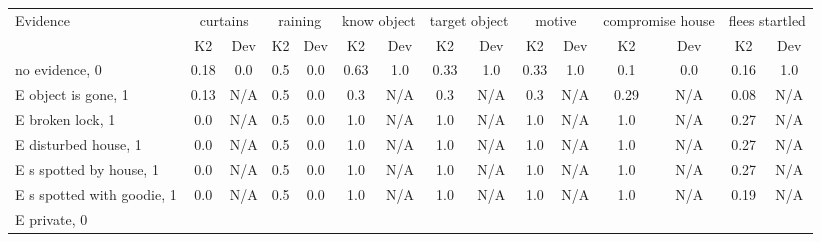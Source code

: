 \begin{table}\begin{tabular}{l|cc|cc|cc|cc|cc|cc|cc}\toprule\multirow{2}{*}{Evidence} & \multicolumn{2}{c}{curtains}& \multicolumn{2}{c}{raining}& \multicolumn{2}{c}{know object}& \multicolumn{2}{c}{target object}& \multicolumn{2}{c}{motive}& \multicolumn{2}{c}{compromise house}& \multicolumn{2}{c}{flees startled}\\& {K2} & {Dev}& {K2} & {Dev}& {K2} & {Dev}& {K2} & {Dev}& {K2} & {Dev}& {K2} & {Dev}& {K2} & {Dev}\\\midrule
no evidence, 0 & \cellcolor{Bittersweet}0.18&\cellcolor{Bittersweet}0.0&\cellcolor{Bittersweet}0.5&\cellcolor{Bittersweet}0.0&\cellcolor{Bittersweet}0.63&\cellcolor{Bittersweet}1.0&\cellcolor{Bittersweet}0.33&\cellcolor{Bittersweet}1.0&\cellcolor{Bittersweet}0.33&\cellcolor{Bittersweet}1.0&\cellcolor{Bittersweet}0.1&\cellcolor{Bittersweet}0.0&\cellcolor{Bittersweet}0.16&\cellcolor{Bittersweet}1.0\\E object is gone, 1 & \cellcolor{Bittersweet}0.13&\cellcolor{Bittersweet}N/A&\cellcolor{Bittersweet}0.5&\cellcolor{Bittersweet}0.0&\cellcolor{Bittersweet}0.3&\cellcolor{Bittersweet}N/A&\cellcolor{Bittersweet}0.3&\cellcolor{Bittersweet}N/A&\cellcolor{Bittersweet}0.3&\cellcolor{Bittersweet}N/A&\cellcolor{Bittersweet}0.29&\cellcolor{Bittersweet}N/A&\cellcolor{Bittersweet}0.08&\cellcolor{Bittersweet}N/A\\E broken lock, 1 & \cellcolor{Bittersweet}0.0&\cellcolor{Bittersweet}N/A&\cellcolor{Bittersweet}0.5&\cellcolor{Bittersweet}0.0&\cellcolor{Bittersweet}1.0&\cellcolor{Bittersweet}N/A&\cellcolor{Bittersweet}1.0&\cellcolor{Bittersweet}N/A&\cellcolor{Bittersweet}1.0&\cellcolor{Bittersweet}N/A&\cellcolor{Bittersweet}1.0&\cellcolor{Bittersweet}N/A&\cellcolor{Bittersweet}0.27&\cellcolor{Bittersweet}N/A\\E disturbed house, 1 & \cellcolor{Bittersweet}0.0&\cellcolor{Bittersweet}N/A&\cellcolor{Bittersweet}0.5&\cellcolor{Bittersweet}0.0&\cellcolor{Bittersweet}1.0&\cellcolor{Bittersweet}N/A&\cellcolor{Bittersweet}1.0&\cellcolor{Bittersweet}N/A&\cellcolor{Bittersweet}1.0&\cellcolor{Bittersweet}N/A&\cellcolor{Bittersweet}1.0&\cellcolor{Bittersweet}N/A&\cellcolor{Bittersweet}0.27&\cellcolor{Bittersweet}N/A\\E s spotted by house, 1 & \cellcolor{Bittersweet}0.0&\cellcolor{Bittersweet}N/A&\cellcolor{Bittersweet}0.5&\cellcolor{Bittersweet}0.0&\cellcolor{Bittersweet}1.0&\cellcolor{Bittersweet}N/A&\cellcolor{Bittersweet}1.0&\cellcolor{Bittersweet}N/A&\cellcolor{Bittersweet}1.0&\cellcolor{Bittersweet}N/A&\cellcolor{Bittersweet}1.0&\cellcolor{Bittersweet}N/A&\cellcolor{Bittersweet}0.27&\cellcolor{Bittersweet}N/A\\E s spotted with goodie, 1 & \cellcolor{Bittersweet}0.0&\cellcolor{Bittersweet}N/A&\cellcolor{Bittersweet}0.5&\cellcolor{Bittersweet}0.0&\cellcolor{Bittersweet}1.0&\cellcolor{Bittersweet}N/A&\cellcolor{Bittersweet}1.0&\cellcolor{Bittersweet}N/A&\cellcolor{Bittersweet}1.0&\cellcolor{Bittersweet}N/A&\cellcolor{Bittersweet}1.0&\cellcolor{Bittersweet}N/A&\cellcolor{Bittersweet}0.19&\cellcolor{Bittersweet}N/A\\E private, 0 & 
\end{tabular}
\end{table}

